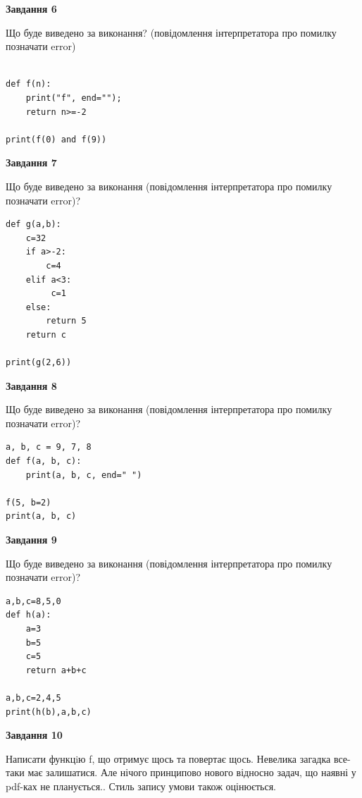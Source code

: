 \documentclass[12pt, ukrainian]{article}
\begin{document}
{\begin {large}
{\begin {center}\textbf{Завдання 6}\end {center}}

Що буде виведено за виконання? (повідомлення інтерпретатора про помилку позначати error)\par
\begin{verbatim}

def f(n):
    print("f", end="");
    return n>=-2

print(f(0) and f(9))
\end{verbatim}

{\begin {center}\textbf{Завдання 7}\end {center}}

Що буде виведено за виконання (повідомлення інтерпретатора про помилку позначати error)?\par
\begin{verbatim}
def g(a,b):
    c=32
    if a>-2:
        c=4
    elif a<3:
         c=1
    else: 
        return 5
    return c

print(g(2,6))
\end{verbatim}

{\begin {center}\textbf{Завдання 8}\end {center}}

Що буде виведено за виконання (повідомлення інтерпретатора про помилку позначати error)?\par
\begin{verbatim}
a, b, c = 9, 7, 8
def f(a, b, c):
    print(a, b, c, end=" ")

f(5, b=2)
print(a, b, c)
\end{verbatim}

{\begin {center}\textbf{Завдання 9}\end {center}}

Що буде виведено за виконання (повідомлення інтерпретатора про помилку позначати error)?\par
\begin{verbatim}
a,b,c=8,5,0
def h(a):
    a=3
    b=5
    c=5
    return a+b+c

a,b,c=2,4,5
print(h(b),a,b,c)
\end{verbatim}

{\begin {center}\textbf{Завдання 10}\end {center}}


Написати функцiю f, що отримує щось та повертає щось. Невелика загадка все-таки має залишатися. Але нічого принципово нового відносно задач, що наявні у pdf-ках не планується.. Стиль запису умови також оцінюється.\par
\end {large}}
\newpage
\end{document}
